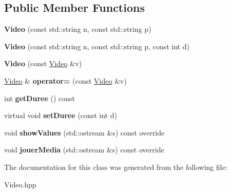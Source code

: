 \subsection*{Public Member Functions}
\begin{DoxyCompactItemize}
\item 
\mbox{\label{class_video_a27f6399893d46221466c03e1a7fa0379}} 
{\bfseries Video} (const std\+::string n, const std\+::string p)
\item 
\mbox{\label{class_video_ac97ed0edce5b8751853838c4bbad9891}} 
{\bfseries Video} (const std\+::string n, const std\+::string p, const int d)
\item 
\mbox{\label{class_video_aad3ac98980a0fab221f4b08a771bfde0}} 
{\bfseries Video} (const \mbox{\hyperlink{class_video}{Video}} \&v)
\item 
\mbox{\label{class_video_a4c239b09f570f77591bdc648117ca5d5}} 
\mbox{\hyperlink{class_video}{Video}} \& {\bfseries operator=} (const \mbox{\hyperlink{class_video}{Video}} \&v)
\item 
\mbox{\label{class_video_a3a53f4b3b9101ff8870581721bbf86bf}} 
int {\bfseries get\+Duree} () const
\item 
\mbox{\label{class_video_a6383f5b95bfdc0efe8a813c6d99bc7da}} 
virtual void {\bfseries set\+Duree} (const int d)
\item 
\mbox{\label{class_video_a8c67f52370e404de8a40f09d101c4e66}} 
void {\bfseries show\+Values} (std\+::ostream \&s) const override
\item 
\mbox{\label{class_video_aa497715c2dfe8568f70f09b2ddaec6ff}} 
void {\bfseries jouer\+Media} (std\+::ostream \&s) const override
\end{DoxyCompactItemize}


The documentation for this class was generated from the following file\+:\begin{DoxyCompactItemize}
\item 
Video.\+hpp\end{DoxyCompactItemize}
